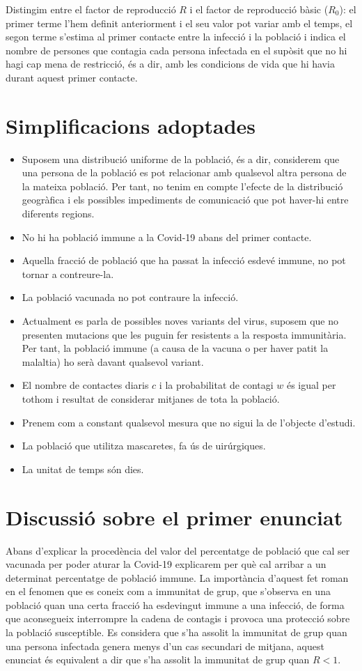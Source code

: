 \documentclass[11pt,a4paper]{article}
\begin{document}
	Distingim entre el factor de reproducció $R$ i el factor de reproducció bàsic ($R_0$): el primer terme l'hem definit anteriorment i el seu valor pot variar amb el temps, el segon terme s'estima al primer contacte entre la infecció i la població i indica el nombre de persones que contagia cada persona infectada en el supòsit que no hi hagi cap mena de restricció, és a dir, amb les condicions de vida que hi havia durant aquest primer contacte.
	
	\section{Simplificacions adoptades}
	\begin{itemize}
		\item Suposem una distribució uniforme de la població, és a dir, considerem que una persona de la població es pot relacionar amb qualsevol altra persona de la mateixa població. Per tant, no tenim en compte l'efecte de la distribució geogràfica i els possibles impediments de comunicació que pot haver-hi entre diferents regions.
		\item No hi ha població immune a la Covid-19 abans del primer contacte.
		\item Aquella fracció de població que ha passat la infecció esdevé immune, no pot tornar a contreure-la. 
		\item La població vacunada no pot contraure la infecció. 
		\item Actualment es parla de possibles noves variants del virus, suposem que no presenten mutacions que les puguin fer resistents a la resposta immunitària. Per tant, la població immune (a causa de la vacuna o per haver patit la malaltia) ho serà davant qualsevol variant.\cite{variants}
		\item El nombre de contactes diaris $c$ i la probabilitat de contagi $w$ és igual per tothom i resultat de considerar mitjanes de tota la població.
		\item Prenem com a constant qualsevol  mesura que no sigui la de l'objecte d'estudi.
		\item La població que utilitza mascaretes, fa ús de uirúrgiques.
		\item La unitat de temps són dies.
	\end{itemize}
	\section{Discussió sobre el primer enunciat}
	Abans d'explicar la procedència del valor del percentatge de població que cal ser vacunada per poder aturar la Covid-19 explicarem per què cal arribar a un determinat percentatge de població immune. La importància d'aquest fet roman en el fenomen que es coneix com a immunitat de grup, que s'observa en una població quan una certa fracció ha esdevingut immune a una infecció, de forma que aconsegueix interrompre la cadena de contagis i provoca una protecció sobre la població susceptible.
	Es considera que s'ha assolit la immunitat de grup quan una persona infectada genera menys d'un cas secundari de mitjana, aquest enunciat és equivalent a dir que s'ha assolit la immunitat de grup quan $R<1$. 
	\cite{viki}\cite{herdimm}\\
	
\end{document}
